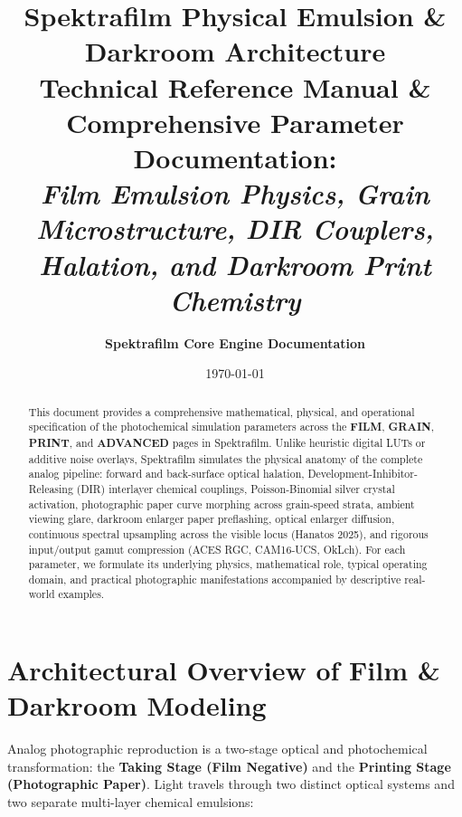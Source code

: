 \documentclass[11pt,a4paper]{article}
\title{\textbf{\LARGE Spektrafilm Physical Emulsion \& Darkroom Architecture}\\[0.4em]
\Large Technical Reference Manual \& Comprehensive Parameter Documentation:\\[0.2em]
\large \textit{Film Emulsion Physics, Grain Microstructure, DIR Couplers, Halation, and Darkroom Print Chemistry}}
\author{\textbf{Spektrafilm Core Engine Documentation}}
\date{\today}
\begin{document}
\maketitle

\begin{abstract}
This document provides a comprehensive mathematical, physical, and operational specification of the photochemical simulation parameters across the \textbf{FILM}, \textbf{GRAIN}, \textbf{PRINT}, and \textbf{ADVANCED} pages in Spektrafilm. Unlike heuristic digital LUTs or additive noise overlays, Spektrafilm simulates the physical anatomy of the complete analog pipeline: forward and back-surface optical halation, Development-Inhibitor-Releasing (DIR) interlayer chemical couplings, Poisson-Binomial silver crystal activation, photographic paper curve morphing across grain-speed strata, ambient viewing glare, darkroom enlarger paper preflashing, optical enlarger diffusion, continuous spectral upsampling across the visible locus (Hanatos 2025), and rigorous input/output gamut compression (ACES RGC, CAM16-UCS, OkLch). For each parameter, we formulate its underlying physics, mathematical role, typical operating domain, and practical photographic manifestations accompanied by descriptive real-world examples.
\end{abstract}

\tableofcontents
\newpage

\section{Architectural Overview of Film \& Darkroom Modeling}

Analog photographic reproduction is a two-stage optical and photochemical transformation: the \textbf{Taking Stage (Film Negative)} and the \textbf{Printing Stage (Photographic Paper)}. Light travels through two distinct optical systems and two separate multi-layer chemical emulsions:
\end{document}
